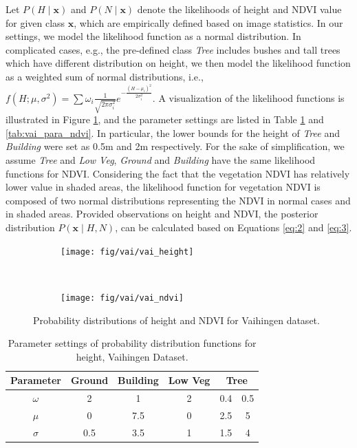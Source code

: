 Let $P\left(H\mid \mathbf{x}\right)$ and $P\left(N\mid \mathbf{x}\right)$ denote the likelihoods of height and NDVI value for given class $\mathbf{x}$, which are empirically defined based on image statistics. In our settings, we model the likelihood function as a normal distribution. In complicated cases, e.g., the pre-defined class \textit{Tree} includes bushes and tall trees which have different distribution on height, we then model the likelihood function as a weighted sum of normal distributions, i.e., $f(H;\mu ,\sigma ^{2}) = \sum \omega_i\frac {1}{\sqrt {2\pi \sigma_i ^{2}}}e^{-\frac {(H-\mu_i )^{2}}{2\sigma_i ^{2}}}$. A visualization of the likelihood functions is illustrated in Figure \ref{fig:vai_distrib}, and the parameter settings are listed in Table \ref{tab:vai_para_h} and \ref{tab:vai_para_ndvi}. In particular, the lower bounds for the height of \textit{Tree} and \textit{Building} were set as 0.5m and 2m respectively. For the sake of simplification, we assume \textit{Tree} and \textit{Low Veg}, \textit{Ground} and \textit{Building} have the same likelihood functions for NDVI. Considering the fact that the vegetation NDVI has relatively lower value in shaded areas, the likelihood function for vegetation NDVI is composed of two normal distributions representing the NDVI in normal cases and in shaded areas. Provided observations on height and NDVI, the posterior distribution $P\left(\mathbf{x} \mid H, N\right)$, can be calculated based on Equations \ref{eq:2} and \ref{eq:3}.

\begin{figure}[htb]
    \centering
       \begin{subfigure}{0.48\columnwidth}
	       \centering
           \texttt{[image: fig/vai/vai\_height]}	
       \end{subfigure}
       ~
       \begin{subfigure}{0.48\columnwidth}
	       \centering
			\texttt{[image: fig/vai/vai\_ndvi]}	
       \end{subfigure}       
       \caption{Probability distributions of height and NDVI for Vaihingen dataset.}
       \label{fig:vai_distrib}
\end{figure}


\begin{table}[htbp]
  \centering
  \caption{Parameter settings of probability distribution functions for height, Vaihingen Dataset.}
    \begin{tabular}{c|c|c|c|c|c}
    \hline
    \textbf{Parameter} & \textbf{Ground} & \textbf{Building} & \textbf{Low Veg} & \multicolumn{2}{c}{\textbf{Tree}} \\
          
    \hline
    $\omega$     & 2     & 1     & 2     & 0.4   & 0.5 \\
    
    $\mu$     & 0     & 7.5   & 0     & 2.5   & 5 \\
    
    $\sigma$ & 0.5   & 3.5   & 1     & 1.5   & 4 \\
    \hline
    \end{tabular}%
  \label{tab:vai_para_h}%
\end{table}%

